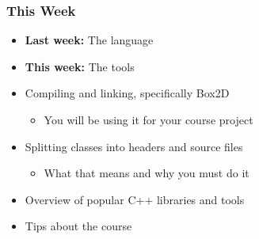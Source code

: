 \documentclass[glossy]{beamer}
\begin{document}
\begin{frame}[fragile=singleslide]
  \frametitle{This Week}
  \begin{itemize}
    \item \textbf{Last week:} The language
    \item \textbf{This week:} The tools
    \item Compiling and linking, specifically Box2D
    \begin{itemize}
      \item You will be using it for your course project
    \end{itemize}
    \item Splitting classes into headers and source files
    \begin{itemize}
      \item What that means and why you must do it
    \end{itemize}
    \item Overview of popular C++ libraries and tools
    \item Tips about the course
  \end{itemize}
\end{frame}

\end{document}
